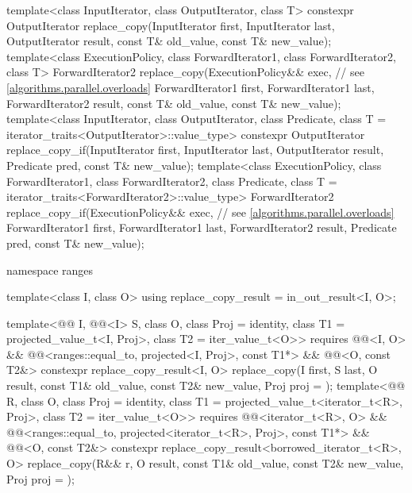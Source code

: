 \begin{codeblock}
{  template<class InputIterator, class OutputIterator, class T>
    constexpr OutputIterator replace_copy(InputIterator first, InputIterator last,
                                          OutputIterator result,
                                          const T& old_value, const T& new_value);
  template<class ExecutionPolicy, class ForwardIterator1, class ForwardIterator2, class T>
    ForwardIterator2 replace_copy(ExecutionPolicy&& exec,       // see \ref{algorithms.parallel.overloads}
                                  ForwardIterator1 first, ForwardIterator1 last,
                                  ForwardIterator2 result,
                                  const T& old_value, const T& new_value);
  template<class InputIterator, class OutputIterator, class Predicate,
           class T = iterator_traits<OutputIterator>::value_type>
    constexpr OutputIterator replace_copy_if(InputIterator first, InputIterator last,
                                             OutputIterator result,
                                             Predicate pred, const T& new_value);
  template<class ExecutionPolicy, class ForwardIterator1, class ForwardIterator2,
           class Predicate, class T = iterator_traits<ForwardIterator2>::value_type>
    ForwardIterator2 replace_copy_if(ExecutionPolicy&& exec,    // see \ref{algorithms.parallel.overloads}
                                     ForwardIterator1 first, ForwardIterator1 last,
                                     ForwardIterator2 result,
                                     Predicate pred, const T& new_value);

  namespace ranges {
    template<class I, class O>
      using replace_copy_result = in_out_result<I, O>;

    template<@@ I, @@<I> S, class O,
             class Proj = identity,
             class T1 = projected_value_t<I, Proj>, class T2 = iter_value_t<O>>
      requires @@<I, O> &&
               @@<ranges::equal_to, projected<I, Proj>, const T1*> &&
               @@<O, const T2&>
      constexpr replace_copy_result<I, O>
        replace_copy(I first, S last, O result, const T1& old_value, const T2& new_value,
                     Proj proj = {});
    template<@@ R, class O, class Proj = identity,
             class T1 = projected_value_t<iterator_t<R>, Proj>, class T2 = iter_value_t<O>>
      requires @@<iterator_t<R>, O> &&
               @@<ranges::equal_to,
                                         projected<iterator_t<R>, Proj>, const T1*> &&
               @@<O, const T2&>
      constexpr replace_copy_result<borrowed_iterator_t<R>, O>
        replace_copy(R&& r, O result, const T1& old_value, const T2& new_value,
                     Proj proj = {});

}}
\end{codeblock}
